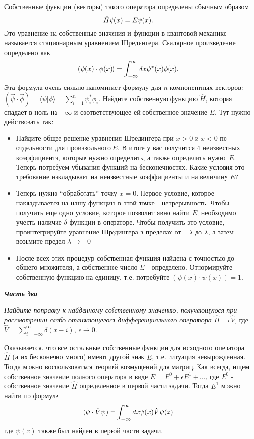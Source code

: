 \documentclass[a4paper,12pt]{article}
\begin{document}
\noindent Собственные функции (векторы) такого оператора определены обычным образом
\begin{equation}\notag
\hat{H}\psi(x)	=E\psi(x).
\end{equation}
\noindent Это уравнение на собственные значения и функции в квантовой механике называется стационарным уравнением Шредингера. Скалярное произведение определено как
\begin{equation}\notag
(\psi(x)\cdot\phi(x))	=\int_{-\infty}^{\infty}dx\psi^{*}(x)\phi(x).
\end{equation}
\noindent Эта формула очень сильно напоминает формулу для $n$-компонентных векторов: $(\vec{\psi}\cdot\vec{\phi})=\langle\psi|\phi\rangle=\sum_{i=1}^{n}\psi_{i}^{*}\phi_{i}$. Найдите собственную функцию $\hat{H}$, которая спадает в ноль на $\pm\infty$ и соответствующее ей собственное значение $E$. Тут нужно действовать так:
\begin{itemize}
\item Найдите общее решение уравнения Шредингера при $x>0$ и $x<0$ по отдельности для произвольного $E$. В итоге у вас получится 4 неизвестных коэффициента, которые нужно определить, а также определить нужно $E$. Теперь потребуем убывания функций на бесконечностях. Какие условия это требование накладывает на неизвестные коэффициенты и на величину $E$? 

\item Теперь нужно “обработать” точку $x=0$. Первое условие, которое накладывается на нашу функцию в этой точке - непрерывность. Чтобы получить еще одно условие, которое позволит явно найти $E$, необходимо учесть наличие $\delta$-функции в операторе. Чтобы получить это условие, проинтегрируйте уравнение Шредингера в пределах от $-\lambda$ до $\lambda$, а затем возьмите предел $\lambda\rightarrow+0$

\item После всех этих процедур собственная функция найдена с точностью до общего множителя, а собственное число $E$ - определено. Отнормируйте собственную функцию на единицу, т.е. потребуйте $(\psi(x)\cdot\psi(x))=1$.
\end{itemize}
\noindent \textit{\textbf{Часть два}}

\noindent \textit{Найдите поправку к найденному собственному значению, получающуюся при рассмотрении слабо отличающегося дифференциального оператора} $\hat{H}+\epsilon\hat{V}$, где $\hat{V}=\sum_{i=-\infty}^{\infty}\delta(x-i)$, $\epsilon\rightarrow 0$.

\noindent Оказывается, что все остальные собственные функции для исходного оператора $\hat{H}$ (а их бесконечно много) имеют другой знак $E$, т.е. ситуация невырожденная. Тогда можно воспользоваться теорией возмущений для матриц. Как всегда, ищем собственное значение полного оператора в виде $E=E^{0}+\epsilon E^{1}+...$, где $E^{0}$ - собственное значение $\hat{H}$ определенное в первой части задачи. Тогда $E^{1}$ можно найти по формуле
\begin{equation}\notag
(\psi\cdot\hat{V}\psi)	=\int_{-\infty}^{\infty}dx\psi(x)\hat{V}\psi(x)
\end{equation}
\noindent где $\psi(x)$ также был найден в первой части задачи.
\end{document}

